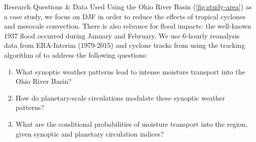 \begin{block}{Research Questions \& Data Used}
    Using  the Ohio River Basin (\cref{fig:study-area}) as a case study, we focus on DJF in order to reduce the effects of tropical cyclones and mesocale convection.
    There is also relvance for flood impacts: the well-known 1937 flood occurred during January and February.
     We use 6-hourly reanalysis data from ERA-Interim \cite{Dee2011} (1979-2015) and cyclone tracks from \cite{Booth2015} using the tracking algorithm of \cite{Hodges1994} to address the following questions:
    \begin{enumerate}
        \item What synoptic weather patterns lead to intense moisture transport into the Ohio River Basin?
        \item How do planetary-scale circulations modulate these synoptic weather patterns?
        \item What are the conditional probabilities of moisture transport into the region, given synoptic and planetary circulation indices?
    \end{enumerate}
\end{block}
